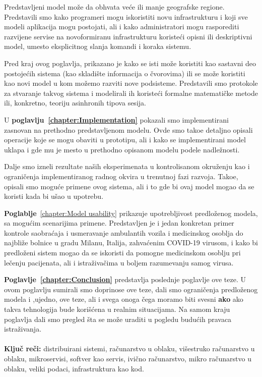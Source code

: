 Predstavljeni model mo\v ze da obhvata ve\'ce ili manje geografske regione. Predstavili smo kako programeri mogu iskoristiti novu infrastrukturu i koji sve modeli aplikacija mogu postojati, ali i kako administratori mogu rasporediti razvijene servise na novoformiranu infrastrukturu koriste\'ci opisni ili deskriptivni model, umesto eksplicitnog slanja komandi i koraka sistemu.

Pred kraj ovog poglavlja, prikazano je kako se isti mo\v ze koristiti kao sastavni deo postoje\'cih sistema (kao skladi\v ste informacija o \v cvorovima) ili se mo\v ze koristiti kao novi model u kom mo\v zemo razviti nove podsisteme. Predstavili smo protokole za stvaranje takvog sistema i modelirali ih koriste\'ci formalne matemati\v cke metode ili, konkretno, teoriju asinhronih tipova sesija.

U \textbf{poglavlju~\ref{chapter:Implementation}} pokazali smo implementirani zasnovan na prethodno predstavljenom modelu. Ovde smo tako\dj e detaljno opisali operacije koje se mogu obaviti u prototipu, ali i kako se implementirani model uklapa i gde mu je mesto u prethodno opisanom modelu podele nadle\v znosti.

Dalje smo izneli rezultate na\v sih eksperimenata u kontrolisanom okru\v zenju kao i ograni\v cenja implementiranog radnog okvira u trenutnoj fazi razvoja. Tako\dj e, opisali smo mogu\'ce primene ovog sistema, ali i to gde bi ovaj model mogao da se koristi kada bi u\v sao u upotrebu.

\textbf{Poglablje}~\ref{chapter:Model usability} prikazuje upotrebljivost predlo\v zenog modela, sa mogu\'cim scenarijima primene. Predstavljen je i jedan konkretan primer kontrole saobra\'caja i usmeravanje ambulantih vozila i medicinskog osoblja do najbli\v ze bolnice u gradu Milanu, Italija, zahva\'cenim COVID-19 virusom, i kako bi predlo\v zeni sistem mogao da se iskoristi da pomogne medicinskom osoblju pri le\v cenju pacijenata, ali i istra\v ziva\v cima u boljem razumevanju samog virusa.

\textbf{Poglavlje~\ref{chapter:Conclusion}} predstavlja poslednje poglavlje ove teze. U ovom poglavlju sumirali smo doprinose ove teze, dali smo ograni\v cenja predlo\v zenog modela i ,ujedno, ove teze, ali i svega onoga \v cega moramo biti svesni \textbf{ako} ako takva tehnologija bude kori\v s\'cena u realnim situacijama. Na samom kraju poglavlja dali smo pregled \v sta se mo\v ze uraditi u pogledu budu\'cih pravaca istra\v zivanja.\\\\

\noindent
\textbf{Klju\v c re\v ci:} distribuirani sistemi, ra\v cunarstvo u oblaku, vi\v sestruko ra\v cunarstvo u oblaku, mikroservisi, softver kao servis, ivi\v cno ra\v cunarstvo, mikro ra\v cunarstvo u oblaku, veliki podaci, infrastruktura kao kod.